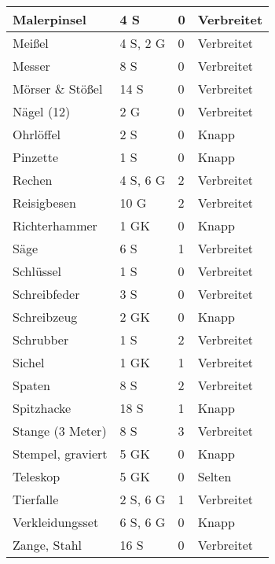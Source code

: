 \documentclass[a4paper, 9pt]{scrreprt}
\begin{document}
\begin{table}[!ht]
\begin{tabular}{llll}
        Malerpinsel         & 4 S            & 0           & Verbreitet             \\ \hline
        Meißel              & 4 S, 2 G       & 0           & Verbreitet             \\ \hline
        Messer              & 8 S            & 0           & Verbreitet             \\ \hline
        Mörser \& Stößel    & 14 S           & 0           & Verbreitet             \\ \hline
        Nägel (12)          & 2 G            & 0           & Verbreitet             \\ \hline
        Ohrlöffel           & 2 S            & 0           & Knapp                  \\ \hline
        Pinzette            & 1 S            & 0           & Knapp                  \\ \hline
        Rechen              & 4 S, 6 G       & 2           & Verbreitet             \\ \hline
        Reisigbesen         & 10 G           & 2           & Verbreitet             \\ \hline
        Richterhammer       & 1 GK           & 0           & Knapp                  \\ \hline
        Säge                & 6 S            & 1           & Verbreitet             \\ \hline
        Schlüssel           & 1 S            & 0           & Verbreitet             \\ \hline
        Schreibfeder        & 3 S            & 0           & Verbreitet             \\ \hline
        Schreibzeug         & 2 GK           & 0           & Knapp                  \\ \hline
        Schrubber           & 1 S            & 2           & Verbreitet             \\ \hline
        Sichel              & 1 GK           & 1           & Verbreitet             \\ \hline
        Spaten              & 8 S            & 2           & Verbreitet             \\ \hline
        Spitzhacke          & 18 S           & 1           & Knapp                  \\ \hline
        Stange (3 Meter)    & 8 S            & 3           & Verbreitet             \\ \hline
        Stempel, graviert   & 5 GK           & 0           & Knapp                  \\ \hline
        Teleskop            & 5 GK           & 0           & Selten                 \\ \hline
        Tierfalle           & 2 S, 6 G       & 1           & Verbreitet             \\ \hline
        Verkleidungsset     & 6 S, 6 G       & 0           & Knapp                  \\ \hline
        Zange, Stahl        & 16 S           & 0           & Verbreitet
    \end{tabular}%
\end{table}
\end{document}
